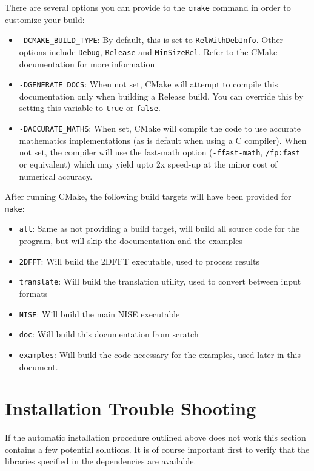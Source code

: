 \documentclass[12pt]{book}
\begin{document}
There are several options you can provide to the {\tt cmake} command in order to customize your build:
\begin{itemize}
\item {\tt -DCMAKE\_BUILD\_TYPE}: By default, this is set to {\tt RelWithDebInfo}. Other options include {\tt Debug}, {\tt Release} and {\tt MinSizeRel}. Refer to the CMake documentation for more information
\item {\tt -DGENERATE\_DOCS}: When not set, CMake will attempt to compile this documentation only when building a Release build. You can override this by setting this variable to {\tt true} or {\tt false}.
\item {\tt -DACCURATE\_MATHS}: When set, CMake will compile the code to use accurate mathematics implementations (as is default when using a C compiler). When not set, the compiler will use the fast-math option ({\tt -ffast-math}, {\tt /fp:fast} or equivalent) which may yield upto 2x speed-up at the minor cost of numerical accuracy.
\end{itemize}

After running CMake, the following build targets will have been provided for {\tt make}:
\begin{itemize}
\item {\tt all}: Same as not providing a build target, will build all source code for the program, but will skip the documentation and the examples
\item {\tt 2DFFT}: Will build the 2DFFT executable, used to process results
\item {\tt translate}: Will build the translation utility, used to convert between input formats
\item {\tt NISE}: Will build the main NISE executable
\item {\tt doc}: Will build this documentation from scratch
\item {\tt examples}: Will build the code necessary for the examples, used later in this document.
\end{itemize}

\section{Installation Trouble Shooting}
If the automatic installation procedure outlined above does not work this section contains a few potential solutions. It is of course important first to verify that the libraries specified in the dependencies are available.
\end{document}
